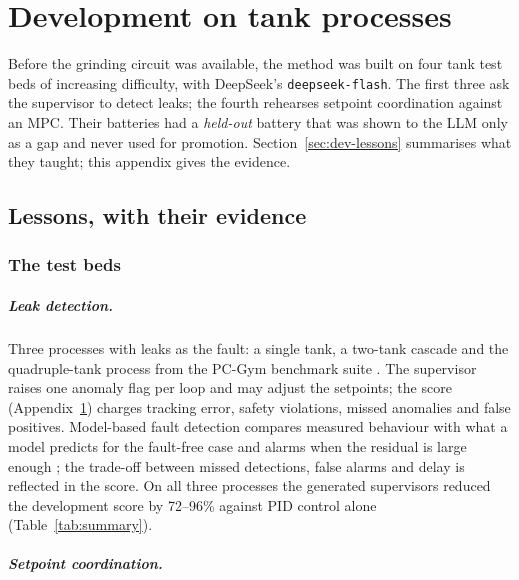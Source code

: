 \chapter{Development on tank processes}
\label{app:tanks}
Before the grinding circuit was available, the method was built on four tank
test beds of increasing difficulty, with DeepSeek's \texttt{deepseek-flash}.
The first three ask the supervisor to detect leaks; the fourth rehearses
setpoint coordination against an MPC. Their batteries had a \emph{held-out}
battery that was shown to the LLM only as a gap and never used for promotion.
Section~\ref{sec:dev-lessons} summarises what they taught; this appendix gives
the evidence.

\section{Lessons, with their evidence}
\subsection{The test beds}
\label{sec:tank-testbeds}
\paragraph{Leak detection.} Three processes with leaks as the fault: a
single tank, a two-tank cascade and the quadruple-tank process
\cite{johansson2000} from the PC-Gym benchmark suite \cite{bloor2024pcgym}.
The supervisor raises one anomaly flag per loop and may adjust the setpoints;
the score (Appendix~\ref{app:tanks}) charges tracking error, safety
violations, missed anomalies and false positives.
Model-based fault detection compares measured behaviour with what a model
predicts for the fault-free case and alarms when the residual is large enough
\cite{isermann2006}; the trade-off between missed detections, false alarms and
delay is reflected in the score. On all three processes the generated
supervisors reduced the development score by 72--96\% against PID control
alone (Table~\ref{tab:summary}).

\paragraph{Setpoint coordination.}

